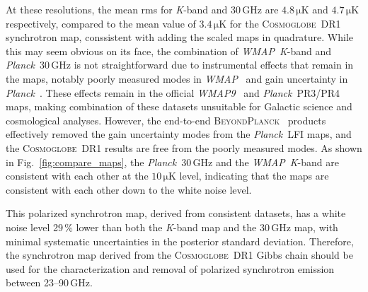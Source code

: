 \documentclass[twocolumn]{../../common/aa}
\def\WMAP{\emph{WMAP}}
\def\WMAPnine{\emph{WMAP9}}
\def\Planck{\emph{Planck}}
\newcommand{\bp}{\textsc{BeyondPlanck}}
\newcommand{\cosmoglobe}{\textsc{Cosmoglobe}}
\newcommand{\K}[0]{\textit K}
\begin{document}
At these resolutions, the mean rms for \K-band and 30\,GHz are $4.8\,\mathrm{\mu K}$ and $4.7\,\mathrm{\mu K}$ respectively, compared to the mean value of $3.4\,\mathrm{\mu K}$ for the \cosmoglobe\ DR1 synchrotron map, conssistent with adding the scaled maps in quadrature.  While this may seem obvious on its face,  the combination of \WMAP\ \K-band and \Planck\ 30\,GHz is not straightforward due to instrumental effects that remain in the maps, notably poorly measured modes in \WMAP\ \citep{bennett2012,weiland:2018} and gain uncertainty in \Planck\ \citep{planck2016-l02}. These effects remain in the official \WMAPnine\ \citep{bennett2012} and \Planck\ PR3/PR4 \citep{planck2016-l02,planck2020-LVII} maps, making combination of these datasets unsuitable for Galactic science and cosmological analyses. However, the end-to-end \bp\ \citep{bp01} products effectively removed the gain uncertainty modes from the \Planck\ LFI maps, and the \cosmoglobe\ DR1 results \citep{watts2023_dr1} are free from the poorly measured modes. As shown in Fig.~\ref{fig:compare_maps}, the \Planck\ 30\,GHz and the \WMAP\ \K-band are consistent with each other at the $10\,\mathrm{\mu K}$ level, indicating that the maps are consistent with each other down to the white noise level. 

This polarized synchrotron map, derived from consistent datasets, has a white noise level 29\,\% lower than both the \K-band map and the 30\,GHz map, with minimal systematic uncertainties in the posterior standard deviation. Therefore, the synchrotron map derived from the \cosmoglobe\ DR1 Gibbs chain should be used for the characterization and removal of polarized synchrotron emission between 23--90\,GHz.
\end{document}
